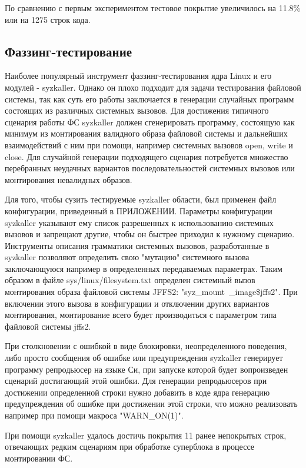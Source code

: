 По сравнению с первым экспериментом тестовое покрытие увеличилось на 11.8\% или на 1275 строк кода.

\subsection{Фаззинг-тестирование}

Наиболее популярный инструмент фаззинг-тестирования ядра Linux и его модулей - syzkaller. Однако он плохо подходит для задачи тестирования файловой системы, так как суть его работы заключается в генерации случайных программ состоящих из различных системных вызовов. Для достижения типичного сценария работы ФС syzkaller должен сгенерировать программу, состоящую как минимум из монтирования валидного образа файловой системы и дальнейших взаимодействий с ним при помощи, например системных вызовов open, write и close. Для случайной генерации подходящего сценария потребуется множество перебранных неудачных вариантов последовательностей системных вызовов или монтирования невалидных образов.

Для того, чтобы сузить тестируемые syzkaller области, был применен файл конфигурации, приведенный в ПРИЛОЖЕНИИ. Параметры конфигурации syzkaller указывают ему список разрешенных к использованию системных вызовов и запрещают другие, чтобы он быстрее приходил к нужному сценарию. Инструменты описания грамматики системных вызовов, разработанные в syzkaller позволяют определить свою "мутацию" системного вызова заключающуюся например в определенных передаваемых параметрах. Таким образом в файле sys/linux/filesystem.txt определен системный вызов монтирования образа файловой системы JFFS2: "syz\_mount\ \_image\$jffs2". При включении этого вызова в конфигурации и отключении других вариантов монтирования, монтирование всего будет производиться с параметром типа файловой системы jffs2.

При столкновении с ошибкой в виде блокировки, неопределенного поведения, либо просто сообщения об ошибке или предупреждения syzkaller генерирует программу репродьюсер на языке Си, при запуске которой будет вопроизведен сценарий достигающий этой ошибки. Для генерации репродьюсеров при достижении определенной строки нужно добавить в коде ядра генерацию предупреждения об ошибке при достижении этой строки, что можно реализовать например при помощи макроса "WARN\_ON(1)".

При помощи syzkaller удалось достичь покрытия 11 ранее непокрытых строк, отвечающих редким сценариям при обработке суперблока в процессе монтировании ФС.

